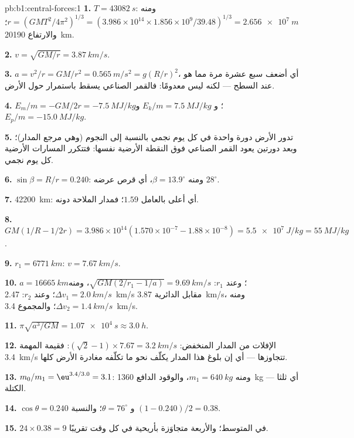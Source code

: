 \begin{solution}{pb:b1:central-forces:1}
\textbf{1.} $T = \qty{43082}{s}$: ومنه $r = (GMT^2/4\pi^2)^{1/3} = (3.986\times10^{14}
\times 1.856\times10^9/39.48)^{1/3} = \qty{2.656e7}{m}$؛ والارتفاع
\qty{20190}{km}.

\textbf{2.} $v = \sqrt{GM/r} = \qty{3.87}{km/s}$.

\textbf{3.} $a = v^2/r = GM/r^2 = \qty{0.565}{m/s^2} = g(R/r)^2$، أي أضعف سبع عشرة
مرة مما هو عند السطح --- لكنه ليس معدومًا: فالقمر الصناعي يسقط
باستمرار حول الأرض.

\textbf{4.} $E_m/m = -GM/2r = \qty{-7.5}{MJ/kg}$؛ و $E_k/m = \qty{+7.5}{MJ/kg}$ و
$E_p/m = \qty{-15.0}{MJ/kg}$.

\textbf{5.} تدور الأرض دورة واحدة في كل يوم نجمي بالنسبة إلى النجوم
(وهي مرجع المدار)؛ وبعد دورتين يعود القمر الصناعي فوق
النقطة الأرضية نفسها: فتتكرر المسارات الأرضية كل يوم نجمي.

\textbf{6.} $\sin\beta = R/r = 0.240$: ومنه $\beta = 13.9^\circ$، أي قرص
عرضه $28^\circ$.

\textbf{7.}  \qty{42200}{km}: أي أعلى بالعامل $1.59$؛
فمدار الملاحة دونه.

\textbf{8.} $GM(1/R - 1/2r) = 3.986\times10^{14}(1.570\times10^{-7} - 1.88\times
10^{-8}) = \qty{5.5e7}{J/kg} = \qty{55}{MJ/kg}$.

\textbf{9.} $r_1 = \qty{6771}{km}$: $v = \qty{7.67}{km/s}$.

\textbf{10.} $a = \qty{16665}{km}$؛ وعند $r_1$: $\sqrt{GM(2/r_1 - 1/a)} =
\qty{9.69}{km/s}$، ومنه $\Delta v_1 = \qty{2.0}{km/s}$؛ وعند $r_2$: \qty{2.47}{km/s}
مقابل الدائرية \qty{3.87}{km/s}، ومنه $\Delta v_2 = \qty{1.4}{km/s}$؛ والمجموع
\qty{3.4}{km/s}.

\textbf{11.} $\pi\sqrt{a^3/GM} = \qty{1.07e4}{s} \approx \qty{3.0}{h}$.

\textbf{12.} الإفلات من المدار المنخفض: $(\sqrt2 - 1)\times 7.67 = \qty{3.2}{km/s}$:
فقيمة المهمة \qty{3.4}{km/s} تتجاوزها --- أي إن بلوغ هذا المدار يكلّف
نحو ما تكلّفه مغادرة الأرض كلها.

\textbf{13.} $m_0/m_1 = \eu^{3.4/3.0} = 3.1$: ومنه $m_1 = \qty{640}{kg}$،
والوقود الدافع \qty{1360}{kg} --- أي ثلثا الكتلة.

\textbf{14.} $\cos\theta = 0.240$ و $\theta = 76^\circ$؛ والنسبة $(1 - 0.240)/2
= 0.38$.

\textbf{15.} $24 \times 0.38 = 9$ في المتوسط؛ والأربعة متجاوَزة
بأريحية في كل وقت تقريبًا.


\end{solution}

